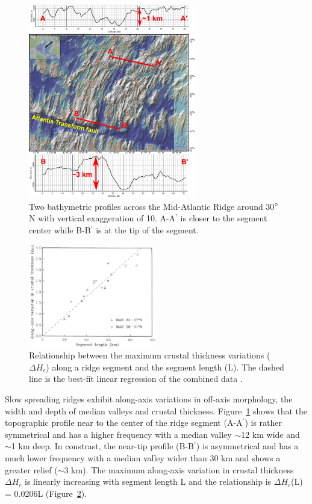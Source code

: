 \begin{figure}[h]
 \centering
  \includegraphics[width=0.65\textwidth]{./Figures/fig_Intro1_2_30N_MAR_offAxisMorphologies.eps}
 \caption{Two bathymetric profiles across the Mid-Atlantic Ridge around 30$\degree$N with vertical exaggeration of 10. A-A$^{\prime}$ is closer to the segment center while B-B$^{\prime}$ is at the tip of the segment.}
  \label{fig_Intro2_1}
\end{figure}

\begin{figure}[h]
 \centering
  \includegraphics[width=0.5\textwidth]{./Figures/fig_Intro3_1.png}
 \caption{Relationship between the maximum crustal thickness variations ($\Delta H_{c}$) along a ridge segment and the segment length (L). The dashed line is the best-fit linear regression of the combined data \citep{Chen1999}.}
 \label{fig_Intro3_1}
\end{figure}

Slow spreading ridges exhibit along-axis variations in off-axis morphology, the width and depth of median valleys and crustal thickness.  Figure~\ref{fig_Intro2_1} shows that the topographic profile near to the center of the ridge segment (A-A$^{\prime}$) is rather symmetrical and has a higher frequency with a median valley $\sim$12 km wide and $\sim$1 km deep. In constrast, the near-tip profile (B-B$^{\prime}$) is asymmetrical and has a much lower frequency with a median valley wider than 30 km and shows a greater relief ($\sim$3 km). The maximum along-axis variation in crustal thickness $\Delta H_{c}$ is linearly increasing with segment length L \citep{Chen1999} and the relationship is $\Delta H_{c}$(L) = 0.0206L (Figure~\ref{fig_Intro3_1}).


